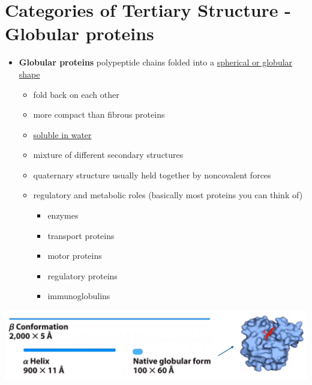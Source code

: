 \documentclass[10pt]{article}
\begin{document}
\section*{Categories of Tertiary Structure - Globular proteins}
\begin{itemize}
    \item \textbf{Globular proteins} polypeptide chains folded into a \underline{spherical or globular shape}
    \begin{itemize}
        \item fold back on each other
        \item more compact than fibrous proteins
        \item \underline{soluble in water}
        \item mixture of different secondary structures
        \item quaternary structure usually held together by noncovalent forces
        \item regulatory and metabolic roles (basically most proteins you can think of)
        \begin{itemize}
            \item enzymes
            \item transport proteins
            \item motor proteins
            \item regulatory proteins
            \item immunoglobulins
        \end{itemize}
    \end{itemize}
\end{itemize}
\begin{center}
    \includegraphics*[width=\textwidth]{L1_2.png}
\end{center}
\end{document}
